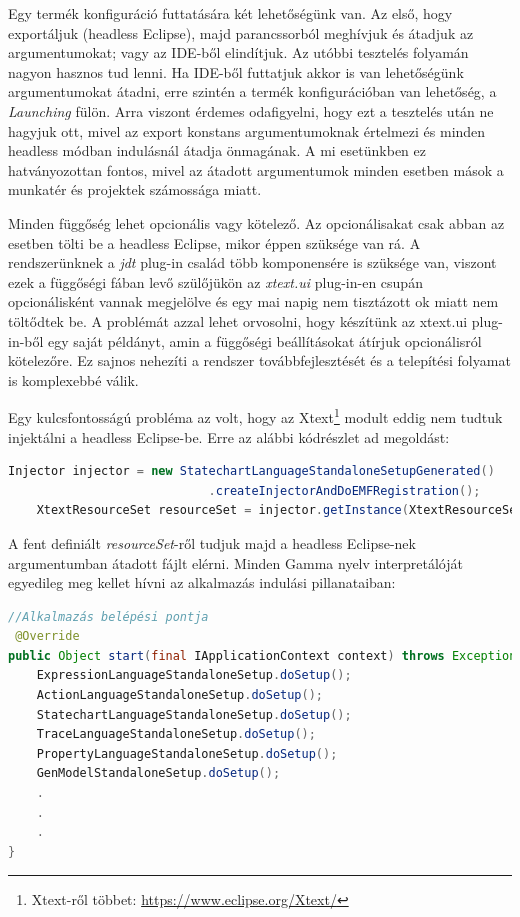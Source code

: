 Egy termék konfiguráció futtatására két lehetőségünk van. Az első, hogy exportáljuk (headless Eclipse), majd parancssorból meghívjuk és átadjuk az argumentumokat; vagy az IDE-ből elindítjuk. Az utóbbi tesztelés folyamán nagyon hasznos tud lenni. Ha IDE-ből futtatjuk akkor is van lehetőségünk argumentumokat átadni, erre szintén a termék konfigurációban van lehetőség, a \textit{Launching} fülön. Arra viszont érdemes odafigyelni, hogy ezt a tesztelés után ne hagyjuk ott, mivel az export konstans argumentumoknak értelmezi és minden headless módban indulásnál átadja önmagának. A mi esetünkben ez hatványozottan fontos, mivel az átadott argumentumok minden esetben mások a munkatér és projektek számossága miatt.

Minden függőség lehet opcionális vagy kötelező. Az opcionálisakat csak abban az esetben tölti be a headless Eclipse, mikor éppen szüksége van rá. A rendszerünknek a \textit{jdt} plug-in család több komponensére is szüksége van, viszont ezek a függőségi fában levő szülőjükön az \textit{xtext.ui} plug-in-en csupán opcionálisként vannak megjelölve és egy mai napig nem tisztázott ok miatt nem töltődtek be. A problémát azzal lehet orvosolni, hogy készítünk az xtext.ui plug-in-ből egy saját példányt, amin a függőségi beállításokat átírjuk opcionálisról kötelezőre. Ez sajnos nehezíti a rendszer továbbfejlesztését és a telepítési folyamat is komplexebbé válik.

Egy kulcsfontosságú probléma az volt, hogy az Xtext\footnote{Xtext-ről többet: \url{https://www.eclipse.org/Xtext/}} modult eddig nem tudtuk injektálni a headless Eclipse-be. Erre az alábbi kódrészlet ad megoldást:
\begin{lstlisting}[language=Java]
 	Injector injector = new StatechartLanguageStandaloneSetupGenerated()
 							.createInjectorAndDoEMFRegistration();
 	XtextResourceSet resourceSet = injector.getInstance(XtextResourceSet.class);
\end{lstlisting}
A fent definiált \textit{resourceSet}-ről tudjuk majd a headless Eclipse-nek argumentumban átadott fájlt elérni.
\newpage
Minden Gamma nyelv interpretálóját egyedileg meg kellet hívni az alkalmazás indulási pillanataiban:

\begin{lstlisting}[language=Java]
//Alkalmazás belépési pontja
 @Override
public Object start(final IApplicationContext context) throws Exception {
	ExpressionLanguageStandaloneSetup.doSetup();
	ActionLanguageStandaloneSetup.doSetup();
	StatechartLanguageStandaloneSetup.doSetup();
	TraceLanguageStandaloneSetup.doSetup();
	PropertyLanguageStandaloneSetup.doSetup();        
	GenModelStandaloneSetup.doSetup();
	.
	.
	.
}
\end{lstlisting}

